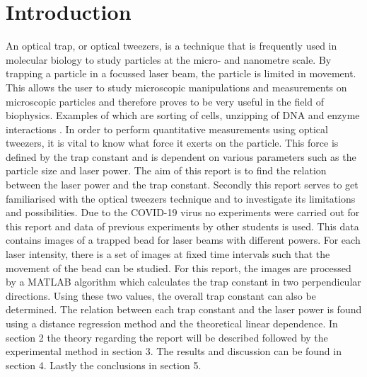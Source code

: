 \section{Introduction}

An optical trap, or optical tweezers, is a technique that is frequently used in molecular biology to study particles at the micro- and nanometre scale. By trapping a particle in a focussed laser beam, the particle is limited in movement. This allows the user to study microscopic manipulations and measurements on microscopic particles and therefore proves to be very useful in the field of biophysics. Examples of which are sorting of cells, unzipping of DNA and enzyme interactions \cite{MIT}\cite{Velthuis}.
In order to perform quantitative measurements using optical tweezers, it is vital to know what force it exerts on the particle. This force is defined by the trap constant and is dependent on various parameters such as the particle size and laser power.
The aim of this report is to find the relation between the laser power and the trap constant. Secondly this report serves to get familiarised with the optical tweezers technique and to investigate its limitations and possibilities.
Due to the COVID-19 virus no experiments were carried out for this report and data of previous experiments by other students is used. This data contains images of a trapped bead for laser beams with different powers. For each laser intensity, there is a set of images at fixed time intervals such that the movement of the bead can be studied. For this report, the images are processed by a MATLAB algorithm which calculates the trap constant in two perpendicular directions. Using these two values, the overall trap constant can also be determined. The relation between each trap constant and the laser power is found using a distance regression method and the theoretical linear dependence.
In section 2 the theory regarding the report will be described followed by the experimental method in section 3. The results and discussion can be found in section 4. Lastly the conclusions in section 5.








